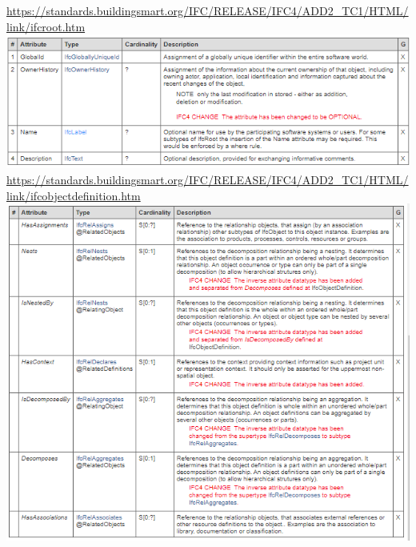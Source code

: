 \documentclass[spanish,12pt,a4paper,final,oneside]{book}
\begin{document}
\url{https://standards.buildingsmart.org/IFC/RELEASE/IFC4/ADD2_TC1/HTML/link/ifcroot.htm}
\\ \includegraphics[width=\textwidth]{atributos de IfcRoot}
\\ \url{https://standards.buildingsmart.org/IFC/RELEASE/IFC4/ADD2_TC1/HTML/link/ifcobjectdefinition.htm}
\\ \includegraphics[width=\textwidth]{atributos de IfcObjectDefinition}
\end{document}
